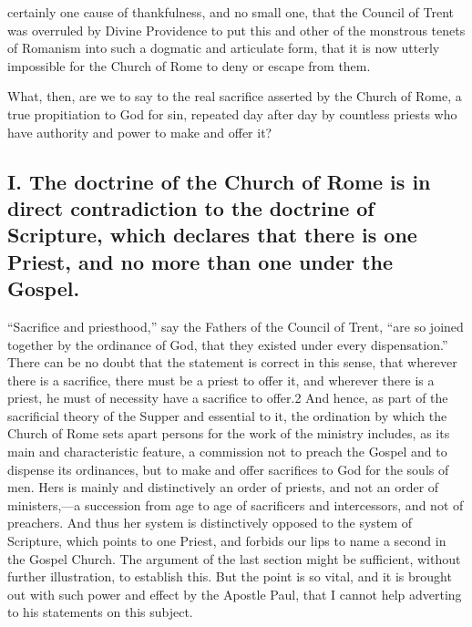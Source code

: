 \documentclass[]{book}
\begin{document}
certainly one cause of thankfulness, and no small one, that the Council of Trent was overruled by Divine Providence to put this and other of the monstrous tenets of Romanism into such a dogmatic and articulate form, that it is now utterly impossible for the Church of Rome to deny or escape from them.

What, then, are we to say to the real sacrifice asserted by the Church of Rome, a true propitiation to God for sin, repeated day after day by countless priests who have authority and power to make and offer it?

\hypertarget{i.-the-doctrine-of-the-church-of-rome-is-in-direct-contradiction-to-the-doctrine-of-scripture-which-declares-that-there-is-one-priest-and-no-more-than-one-under-the-gospel.}{%
\subsection{I. The doctrine of the Church of Rome is in direct contradiction to the doctrine of Scripture, which declares that there is one Priest, and no more than one under the Gospel.}\label{i.-the-doctrine-of-the-church-of-rome-is-in-direct-contradiction-to-the-doctrine-of-scripture-which-declares-that-there-is-one-priest-and-no-more-than-one-under-the-gospel.}}

``Sacrifice and priesthood,'' say the Fathers of the Council of Trent, ``are so joined together by the ordinance of God, that they existed under every dispensation.'' There can be no doubt that the statement is correct in this sense, that wherever there is a sacrifice, there must be a priest to offer it, and wherever there is a priest, he must of necessity have a sacrifice to offer.2 And hence, as part of the sacrificial theory of the Supper and essential to it, the ordination by which the Church of Rome sets apart persons for the work of the ministry includes, as its main and characteristic feature, a commission not to preach the Gospel and to dispense its ordinances, but to make and offer sacrifices to God for the souls of men. Hers is mainly and distinctively an order of priests, and not an order of ministers,---a succession from age to age of sacrificers and intercessors, and not of preachers. And thus her system is distinctively opposed to the system of Scripture, which points to one Priest, and forbids our lips to name a second in the Gospel Church. The argument of the last section might be sufficient, without further illustration, to establish this. But the point is so vital, and it is brought out with such power and effect by the Apostle Paul, that I cannot help adverting to his statements on this subject.
\end{document}
